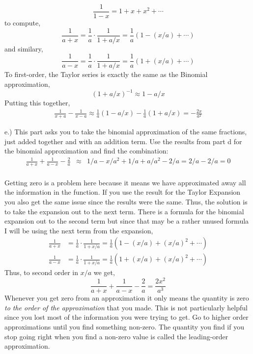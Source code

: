 \documentclass[11pt]{amsart}
\begin{document}
\[ \frac{1}{1 - x} = 1 + x + x^2 + \cdots \]
to compute,
\[ \frac{1}{a + x} = \frac{1}{a} \cdot \frac{1}{1 + a / x} = \frac{1}{a} \left(1 - (x / a) + \cdots \right) \]
and similary,
\[ \frac{1}{a - x} = \frac{1}{a} \cdot \frac{1}{1 + a / x} = \frac{1}{a} \left(1 + (x / a) + \cdots \right) \]
To first-order, the Taylor series is exactly the same as the Binomial approximation,
\[ 
\left(1 + a / x \right)^{-1} \approx 1 - a /x \]
Putting this together,
\begin{eqnarray*} 
\frac{1}{x + a} - \frac{1}{x - a} \approx \frac{1}{a} \left( 1 - a /x \right) - \frac{1}{a} \left( 1 + a /x \right) = - \frac{2 x}{a^2} 
\end{eqnarray*}

e.) This part asks you to take the binomial approximation of the same fractions, just added together and with an addition term. Use the results from part d for the binomial approximation and find the combination: \\ 
\begin{eqnarray*}
\frac{1}{a+x} + \frac{1}{a-x} - \frac{2}{a} &\approx& 1/a - x/a^{2} + 1/a + a/a^{2} -2/a = 2/a - 2/a = 0 
\end{eqnarray*} \\
Getting zero is a problem here because it means we have approximated away all the information in the function. If you use the result for the Taylor Expansion you also get the same issue since the results were the same. Thus, the solution is to take the expansion out to the next term. There is a formula for the binomial expansion out to the second term but since that may be a rather unused formula I will be using the next term from the expansion,
\begin{align*}
\frac{1}{a + x} & = \frac{1}{a} \cdot \frac{1}{1 + x/a} = \frac{1}{a} \left( 1 - (x / a) + (x / a)^2 + \cdots \right)
\\
\frac{1}{a - x} & = \frac{1}{a} \cdot \frac{1}{1 + x/a} = \frac{1}{a} \left( 1 + (x / a) + (x / a)^2 + \cdots \right)
\end{align*}
Thus, to second order in $x/a$ we get,
\[ \frac{1}{a+x} + \frac{1}{a-x} - \frac{2}{a} = \frac{2 x^2}{a^3} \]
Whenever you get zero from an approximation it only means the quantity is zero \textit{to the order of the approximation} that you made. This is not particularly helpful since you lost most of the information you were trying to get. Go to higher order approximations until you find something non-zero. The quantity you find if you stop going right when you find a non-zero value is called the leading-order approximation. 
\end{document}
